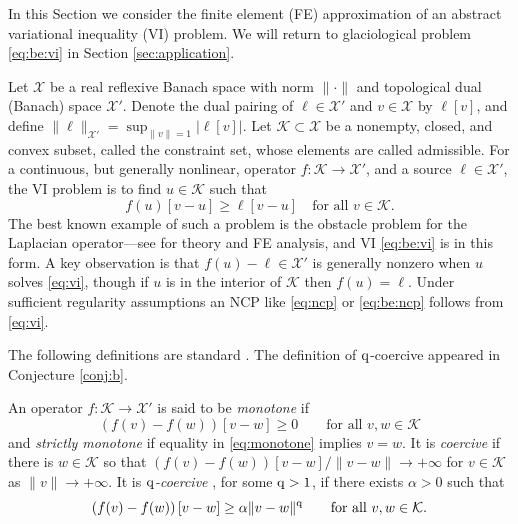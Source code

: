 \documentclass[hidelinks,onefignum,onetabnum,final]{siamart220329}  %
\newcommand{\cK}{\mathcal{K}}
\newcommand{\cX}{\mathcal{X}}
\newcommand{\qq}{{\text{\textnormal{q}}}}
\begin{document}
In this Section we consider the finite element (FE) approximation of an abstract variational inequality (VI) problem.  We will return to glaciological problem \eqref{eq:be:vi} in Section \ref{sec:application}.

Let $\cX$ be a real reflexive Banach space with norm $\|\cdot\|$ and topological dual (Banach) space $\cX'$.  Denote the dual pairing of $\ell \in \cX'$ and $v\in\cX$ by $\ell[v]$, and define $\|\ell\|_{\cX'} = \sup_{\|v\|=1} \big|\ell[v]\big|$.  Let $\cK \subset \cX$ be a nonempty, closed, and convex subset, called the constraint set, whose elements are called admissible.  For a continuous, but generally nonlinear, operator $f:\cK \to \cX'$, and a source $\ell\in \cX'$, the VI problem is to find $u\in \cK$ such that
\begin{equation}
f(u)[v-u] \ge \ell[v-u] \quad \text{for all } v\in \cK. \label{eq:vi}
\end{equation}
The best known example of such a problem is the obstacle problem for the Laplacian operator---see \cite{Ciarlet2002,Evans2010,KinderlehrerStampacchia1980} for theory and FE analysis, and VI \eqref{eq:be:vi} is in this form.  A key observation is that $f(u)-\ell \in \cX'$ is generally nonzero when $u$ solves \eqref{eq:vi}, though if $u$ is in the interior of $\cK$ then $f(u)=\ell$.  Under sufficient regularity assumptions an NCP like \eqref{eq:ncp} or \eqref{eq:be:ncp} follows from \eqref{eq:vi}.

The following definitions are standard \cite[Chapter III]{KinderlehrerStampacchia1980}.  The definition of $\qq$-coercive appeared in Conjecture \ref{conj:b}.

\begin{definition} \label{def:monotonecoercive}
An operator $f:\cK \to \cX'$ is said to be \emph{monotone} if
\begin{equation}
\left(f(v)-f(w)\right)[v-w] \ge 0 \qquad \text{for all } v,w \in \cK \label{eq:monotone}
\end{equation}
and \emph{strictly monotone} if equality in \eqref{eq:monotone} implies $v=w$.  It is \emph{coercive} if there is $w\in \cK$ so that $\left(f(v)-f(w)\right)[v-w]/\|v-w\| \to +\infty$ for $v \in \cK$ as $\|v\| \to +\infty$.  It is \emph{$\qq$-coercive} \cite{Bueler2021conservation}, for some $\qq>1$, if there exists $\alpha>0$ such that
\begin{equation}
\left(f(v)-f(w)\right)[v-w] \ge \alpha \|v-w\|^\qq \qquad \text{for all } v,w \in \cK. \label{eq:qcoercive}
\end{equation}
\end{definition}
\end{document}
